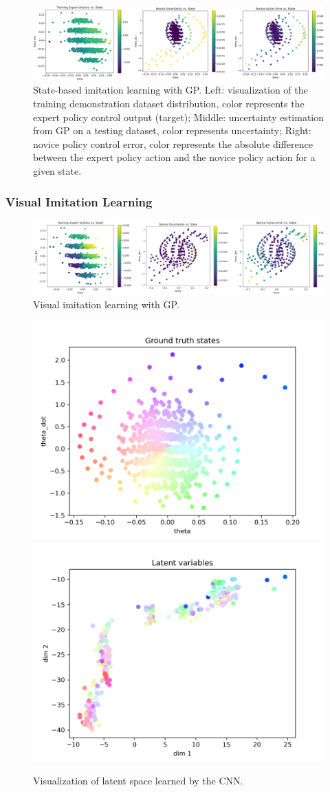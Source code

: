 \documentclass[11pt, reqno, letterpaper, twoside]{amsart}
\begin{document}
\begin{figure}[ht]
    \centering
    \includegraphics[width=\linewidth]{imgs/state-il.png}
    \caption{State-based imitation learning with GP. Left: visualization of the training demonstration dataset distribution, color represents the expert policy control output (target); Middle: uncertainty estimation from GP on a testing dataset, color represents uncertainty; Right: novice policy control error, color represents the absolute difference between the expert policy action and the novice policy action for a given state.}
    \label{fig:state-il}
\end{figure}
    
\subsubsection{Visual Imitation Learning}


\begin{figure}[ht]
    \centering
    \includegraphics[width=\linewidth]{imgs/visual-il.png}
    \caption{Visual imitation learning with GP.}
    \label{fig:visual-il}
\end{figure}

\begin{figure}[ht]
    \centering
    \includegraphics[width=0.4\linewidth]{imgs/latentVis_gt_states_0.png}
    \includegraphics[width=0.4\linewidth]{imgs/latentVis_latents_0.png}
    \caption{Visualization of latent space learned by the CNN.}
    \label{fig:latent}
\end{figure}
\end{document}

